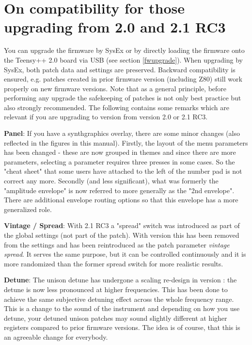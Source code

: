 \documentclass[landscape, 11pt, oneside, twoside]{report}
\newenvironment{flowtext}{\addmargin[0cm]{0cm}}{\endaddmargin} %
\begin{document}
\begin{flowtext}
\section{On compatibility for those upgrading from 2.0 and 2.1 RC3}

You can upgrade the firmware by SysEx or by directly loading the firmware onto the Teensy++ 2.0 board via USB (see section \ref{fwupgrade}). When upgrading by SysEx, both patch data and settings are preserved. Backward compatibility is ensured, e.g. patches created in prior firmware version (including Z80) still work properly on new firmware versions. Note that as a general principle, before performing any upgrade the safekeeping of patches is not only best practice but also strongly recommended. The following contains some remarks which are relevant if you are upgrading to version \version from version 2.0 or 2.1 RC3.

\textbf{Panel}: If you have a synthgraphics overlay, there are some minor changes (also reflected in the figures in this manual). Firstly, the layout of the menu parameters has been changed - these are now grouped in themes and since there are more parameters, selecting a parameter requires three presses in some cases. So the "cheat sheet" that some users have attached to the left of the number pad is not correct any more. Secondly (and less significant), what was formerly the "amplitude envelope" is now referred to more generally as the "2nd envelope". There are additional envelope routing options so that this envelope has a more generalized role. 

\textbf{Vintage / Spread}: With 2.1 RC3 a "spread" switch was introduced as part of the global settings (not part of the patch). With version \version this has been removed from the settings and has been reintroduced as the patch parameter \textit{vintage spread}. It serves the same purpose, but it can be controlled continuously and it is more randomized than the former spread switch for more realistic results.

\textbf{Detune}: The unison detune has undergone a scaling re-design in version \version: the detune is now less pronounced at higher frequencies. This has been done to achieve the same subjective detuning effect across the whole frequency range. This is a change to the sound of the instrument and depending on how you use detune, your detuned unison patches may sound slightly different at higher registers compared to prior firmware versions. The idea is of course, that this is an agreeable change for everybody.


\end{flowtext}
\end{document}
